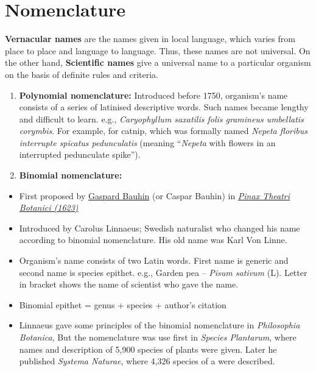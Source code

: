 \documentclass[
]{book}
\providecommand{\tightlist}{%
  \setlength{\itemsep}{0pt}\setlength{\parskip}{0pt}}
\begin{document}
\hypertarget{nomenclature}{%
\section{Nomenclature}\label{nomenclature}}

\textbf{Vernacular names} are the names given in local language, which varies from place to place and language to language. Thus, these names are not universal. On the other hand, \textbf{Scientific names} give a universal name to a particular organism on the basis of definite rules and criteria.

\begin{enumerate}
\def\labelenumi{\arabic{enumi}.}
\item
  \textbf{Polynomial nomenclature:} Introduced before 1750, organism's name consists of a series of latinised descriptive words. Such names became lengthy and difficult to learn. e.g., \emph{Caryophyllum saxatilis folis gramineus umbellatis corymbis}. For example, for catnip, which was formally named \emph{Nepeta floribus interrupte spicatus pedunculatis} (meaning ``\emph{Nepeta} with flowers in an interrupted pedunculate spike'').
\item
  \textbf{Binomial nomenclature:}
\end{enumerate}

\begin{itemize}
\tightlist
\item
  First proposed by \href{https://en.wikipedia.org/wiki/Gaspard_Bauhin}{Gaspard Bauhin} (or Caspar Bauhin) in \href{https://bibdigital.rjb.csic.es/idurl/1/10754}{\emph{Pinax Theatri Botanici (1623)}}
\item
  Introduced by Carolus Linnaeus; Swedish naturalist who changed his name according to binomial nomenclature. His old name was Karl Von Linne.
\item
  Organism's name consists of two Latin words. First name is generic and second name is species epithet. e.g., Garden pea -- \emph{Pisum sativum} (L). Letter in bracket shows the name of scientist who gave the name.
\item
  Binomial epithet = genus + species + author's citation
\item
  Linnaeus gave some principles of the binomial nomenclature in \emph{Philosophia Botanica}, But the nomenclature was use first in \emph{Species Plantarum}, where names and description of 5,900 species of plants were given. Later he published \emph{Systema Naturae}, where 4,326 species of a were described.
\end{itemize}
\end{document}
